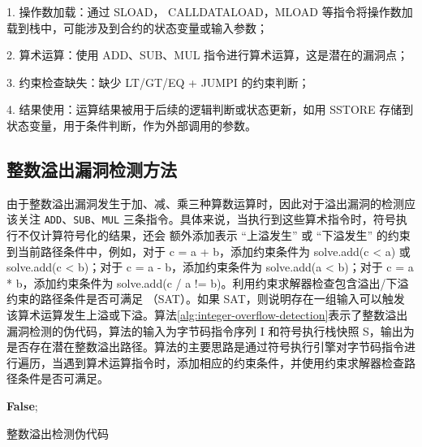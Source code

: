 \documentclass[print, master, vlined, timesmath]{DissertUESTC}
\begin{document}
1. 操作数加载：通过 SLOAD， CALLDATALOAD，MLOAD 等指令将操作数加载到栈中，可能涉及到合约的状态变量或输入参数；

2. 算术运算：使用 ADD、SUB、MUL 指令进行算术运算，这是潜在的漏洞点；

3. 约束检查缺失：缺少 LT/GT/EQ + JUMPI 的约束判断；

4. 结果使用：运算结果被用于后续的逻辑判断或状态更新，如用 SSTORE 存储到状态变量，用于条件判断，作为外部调用的参数。





\subsection{整数溢出漏洞检测方法}

由于整数溢出漏洞发生于加、减、乘三种算数运算时，因此对于溢出漏洞的检测应该关注 \texttt{ADD}、\texttt{SUB}、\texttt{MUL} 三条指令。具体来说，当执行到这些算术指令时，符号执行不仅计算符号化的结果，还会
额外添加表示 “上溢发生” 或 “下溢发生” 的约束到当前路径条件中，例如，对于 c = a + b，添加约束条件为 solve.add(c < a) 或 solve.add(c < b)；对于 c = a - b，添加约束条件为 solve.add(a < b)；对于 c = a * b，添加约束条件为 solve.add(c / a != b)。利用约束求解器检查包含溢出/下溢约束的路径条件是否可满足
（SAT）。如果 SAT，则说明存在一组输入可以触发该算术运算发生上溢或下溢。算法\ref{alg:integer-overflow-detection}表示了整数溢出漏洞检测的伪代码，算法的输入为字节码指令序列 I 和符号执行栈快照 S，输出为是否存在潜在整数溢出路径。算法的主要思路是通过符号执行引擎对字节码指令进行遍历，当遇到算术运算指令时，添加相应的约束条件，并使用约束求解器检查路径条件是否可满足。




\begin{algorithm}


    \Return \textbf{False};
    \caption{整数溢出检测伪代码}
    \label{alg:integer-overflow-detection}
\end{algorithm}
   
\end{document}
